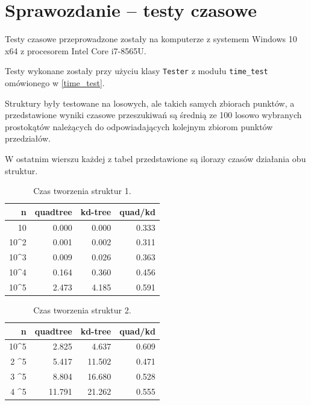 \documentclass{article}
\begin{document}
\section{Sprawozdanie -- testy czasowe}

Testy czasowe przeprowadzone zostały na komputerze z systemem Windows 10 x64 z procesorem Intel Core i7-8565U.

Testy wykonane zostały przy użyciu klasy \texttt{Tester} z modułu \texttt{time\_test} omówionego w \ref{time_test}.

Struktury były testowane na losowych, ale takich samych zbiorach punktów, a przedstawione wyniki czasowe przeszukiwań są średnią ze 100 losowo wybranych prostokątów należących do odpowiadających kolejnym zbiorom punktów przedziałów.

W ostatnim wierszu każdej z tabel przedstawione są ilorazy czasów działania obu struktur.

\begin{table}[H]
    \centering
    \begin{tabular}{r|rrr}
        n & quadtree & kd-tree & quad/kd \\ \hline
        10 & 0.000 & 0.000 & 0.333 \\
        10^2 & 0.001 & 0.002 & 0.311 \\
        10^3 & 0.009 & 0.026 & 0.363 \\
        10^4 & 0.164 & 0.360 & 0.456 \\
        10^5 & 2.473 & 4.185 & 0.591 \\
    \end{tabular}
    \caption{Czas tworzenia struktur 1.}
    \label{tab:buildup1}
\end{table}

\begin{table}[H]
    \centering
    \begin{tabular}{r|rrr}
        n & quadtree & kd-tree & quad/kd \\ \hline
        10^5 & 2.825 & 4.637 & 0.609 \\
        2 \cdot 10^5 & 5.417 & 11.502 & 0.471 \\
        3 \cdot 10^5 & 8.804 & 16.680 & 0.528 \\
        4 \cdot 10^5 & 11.791 & 21.262 & 0.555 \\
    \end{tabular}
    \caption{Czas tworzenia struktur 2.}
    \label{tab:buildup2}
\end{table}
\end{document}
